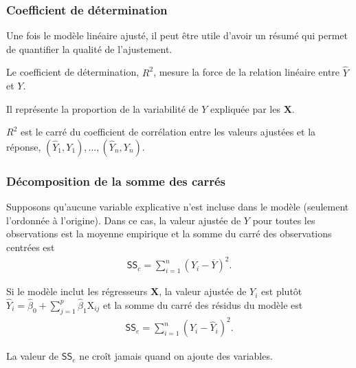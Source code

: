 \documentclass[xcolor={dvipsnames}]{beamer}
\begin{document}
\begin{frame}
\frametitle{Coefficient de détermination}
\bi
\item Une fois le modèle linéaire ajusté, il peut être utile d'avoir un résumé qui permet de quantifier la qualité de l'ajustement.
\item Le \alert{coefficient de détermination}, $R^2$, mesure la force de la relation linéaire entre $\hat{Y}$ et $Y$.  
\item Il représente la \alert{proportion de la variabilité} de $Y$ expliquée par les $\mathbf{X}$.
\item $R^2$ est le carré du coefficient de corrélation entre les valeurs ajustées et la réponse, $(\hat{Y}_1,Y_1),\ldots,(\hat{Y}_n,Y_n)$.
\ei
\end{frame}

\begin{frame}
\frametitle{Décomposition de la somme des carrés}
\bi
\item Supposons qu'aucune variable explicative n'est incluse dans le modèle (seulement l'ordonnée à l'origine). Dans ce cas, la valeur ajustée de $Y$ pour toutes les observations est la moyenne empirique et la somme du carré des observations centrées est
\begin{align*}
\mathsf{SS}_c=\sum_{i=1}^n (Y_i-\overline{Y})^2.                                      \end{align*}
\item Si le modèle inclut les régresseurs $\mathbf{X}$, la valeur ajustée de $Y_i$ est plutôt $\widehat{Y}_i=\widehat{\beta}_0+\sum_{j=1}^p\widehat{\beta}_1 \mathrm{X}_{ij}$ et la somme du carré des résidus du modèle est
\begin{align*}
\mathsf{SS}_e=\sum_{i=1}^n (Y_i-\widehat{Y}_i)^2.                                            \end{align*}
\item La valeur de $\mathsf{SS}_e$ ne croît jamais quand on ajoute des variables.
\ei
\end{frame}
% 
% 
\end{document}
